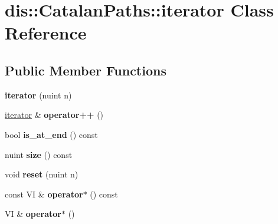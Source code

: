 \hypertarget{classdis_1_1_catalan_paths_1_1iterator}{\section{dis\-:\-:Catalan\-Paths\-:\-:iterator Class Reference}
\label{classdis_1_1_catalan_paths_1_1iterator}
}
\subsection*{Public Member Functions}
\begin{DoxyCompactItemize}
\item 
\hypertarget{classdis_1_1_catalan_paths_1_1iterator_a76517fe1784d5129f8b55af6ec79a50c}{{\bfseries iterator} (nuint n)}\label{classdis_1_1_catalan_paths_1_1iterator_a76517fe1784d5129f8b55af6ec79a50c}

\item 
\hypertarget{classdis_1_1_catalan_paths_1_1iterator_aa1891aba3d22fb03b330a6ef70fcd4d4}{\hyperlink{classdis_1_1_catalan_paths_1_1iterator}{iterator} \& {\bfseries operator++} ()}\label{classdis_1_1_catalan_paths_1_1iterator_aa1891aba3d22fb03b330a6ef70fcd4d4}

\item 
\hypertarget{classdis_1_1_catalan_paths_1_1iterator_abf97163f276b8735eda3bc2c465ec14b}{bool {\bfseries is\-\_\-at\-\_\-end} () const }\label{classdis_1_1_catalan_paths_1_1iterator_abf97163f276b8735eda3bc2c465ec14b}

\item 
\hypertarget{classdis_1_1_catalan_paths_1_1iterator_ae62d1bddf81f2a0661ab6afa8b23ec12}{nuint {\bfseries size} () const }\label{classdis_1_1_catalan_paths_1_1iterator_ae62d1bddf81f2a0661ab6afa8b23ec12}

\item 
\hypertarget{classdis_1_1_catalan_paths_1_1iterator_aee59c82e5ce922a203afd632d697ce2b}{void {\bfseries reset} (nuint n)}\label{classdis_1_1_catalan_paths_1_1iterator_aee59c82e5ce922a203afd632d697ce2b}

\item 
\hypertarget{classdis_1_1_catalan_paths_1_1iterator_a98dd0220326a591a100361fbcc91d048}{const V\-I \& {\bfseries operator$\ast$} () const }\label{classdis_1_1_catalan_paths_1_1iterator_a98dd0220326a591a100361fbcc91d048}

\item 
\hypertarget{classdis_1_1_catalan_paths_1_1iterator_a605ece443ade173ecabcab9c0bbbc7af}{V\-I \& {\bfseries operator$\ast$} ()}\label{classdis_1_1_catalan_paths_1_1iterator_a605ece443ade173ecabcab9c0bbbc7af}


\end{DoxyCompactItemize}
